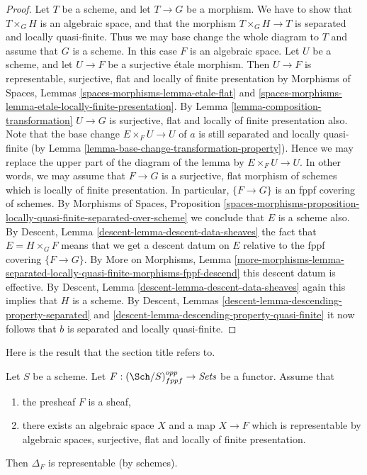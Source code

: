\begin{proof}
Let $T$ be a scheme, and let $T \to G$ be a morphism.
We have to show that $T \times_G H$ is an algebraic space, and that
the morphism $T \times_G H \to T$ is separated and
locally quasi-finite. Thus we may base change the whole diagram to $T$
and assume that $G$ is a scheme. In this case $F$ is an algebraic space.
Let $U$ be a scheme, and let $U \to F$ be a surjective \'etale morphism.
Then $U \to F$ is representable, surjective, flat and
locally of finite presentation by
Morphisms of Spaces,
Lemmas \ref{spaces-morphisms-lemma-etale-flat} and
\ref{spaces-morphisms-lemma-etale-locally-finite-presentation}.
By
Lemma \ref{lemma-composition-transformation}
$U \to G$ is surjective, flat and locally of finite presentation also.
Note that the base change $E \times_F U \to U$ of $a$ is still
separated and locally quasi-finite (by
Lemma \ref{lemma-base-change-transformation-property}). Hence we
may replace the upper part of the diagram of the lemma by
$E \times_F U \to U$. In other words, we may assume that
$F \to G$ is a surjective, flat morphism of schemes
which is locally of finite presentation.
In particular, $\{F \to G\}$ is an fppf covering of schemes.
By
Morphisms of Spaces, Proposition
\ref{spaces-morphisms-proposition-locally-quasi-finite-separated-over-scheme}
we conclude that $E$ is a scheme also.
By
Descent, Lemma \ref{descent-lemma-descent-data-sheaves}
the fact that $E = H \times_G F$ means that we get a descent datum
on $E$ relative to the fppf covering $\{F \to G\}$.
By
More on Morphisms, Lemma
\ref{more-morphisms-lemma-separated-locally-quasi-finite-morphisms-fppf-descend}
this descent datum is effective.
By
Descent, Lemma \ref{descent-lemma-descent-data-sheaves}
again this implies that $H$ is a scheme.
By
Descent, Lemmas \ref{descent-lemma-descending-property-separated} and
\ref{descent-lemma-descending-property-quasi-finite}
it now follows that $b$ is separated and locally quasi-finite.
\end{proof}

\noindent
Here is the result that the section title refers to.

\begin{lemma}
\label{lemma-bootstrap-diagonal}
Let $S$ be a scheme.
Let $F : (\Sch/S)_{fppf}^{opp} \to \textit{Sets}$ be a functor.
Assume that
\begin{enumerate}
\item the presheaf $F$ is a sheaf,
\item there exists an algebraic space $X$ and a map $X \to F$
which is representable by algebraic spaces, surjective, flat and
locally of finite presentation.
\end{enumerate}
Then $\Delta_F$ is representable (by schemes).
\end{lemma}

